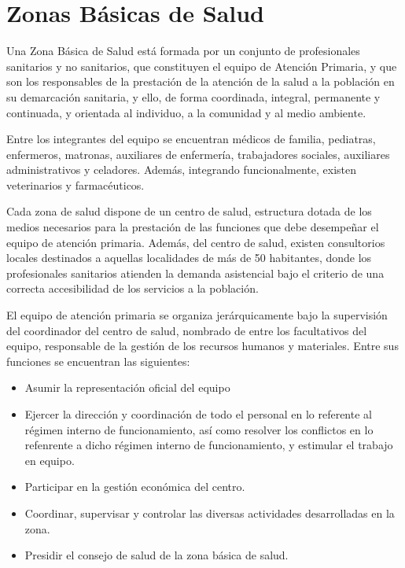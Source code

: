 \section{Zonas Básicas de Salud}

Una Zona Básica de Salud está formada por un conjunto de profesionales sanitarios y no sanitarios, que constituyen el equipo de Atención Primaria, y que son los responsables de la prestación de la atención de la salud a la población en su demarcación sanitaria, y ello, de forma coordinada, integral, permanente y continuada, y orientada al individuo, a la comunidad y al medio ambiente.

Entre los integrantes del equipo se encuentran médicos de familia, pediatras, enfermeros, matronas, auxiliares de enfermería, trabajadores sociales, auxiliares administrativos y celadores. Además, integrando funcionalmente, existen veterinarios y farmacéuticos.

Cada zona de salud dispone de un centro de salud, estructura dotada de los medios necesarios para la prestación de las funciones que debe desempeñar el equipo de atención primaria. Además, del centro de salud, existen consultorios locales destinados a aquellas localidades de más de 50 habitantes, donde los profesionales sanitarios atienden la demanda asistencial bajo el criterio de una correcta accesibilidad de los servicios a la población.

El equipo de atención primaria se organiza jerárquicamente bajo la supervisión del coordinador del centro de salud, nombrado de entre los facultativos del equipo, responsable de la gestión de los recursos humanos y materiales. Entre sus funciones se encuentran las siguientes:

\begin{itemize}
    \item Asumir la representación oficial del equipo
    \item Ejercer la dirección y coordinación de todo el personal en lo referente al régimen interno de funcionamiento, así como resolver los conflictos en lo refenrente a dicho régimen interno de funcionamiento, y estimular el trabajo en equipo.
    \item Participar en la gestión económica del centro.
    \item Coordinar, supervisar y controlar las diversas actividades desarrolladas en la zona.
    \item Presidir el consejo de salud de la zona básica de salud.
\end{itemize}

